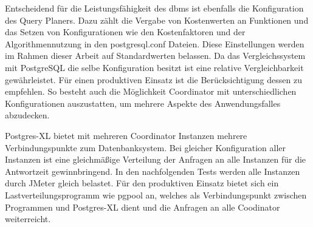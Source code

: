 Entscheidend für die Leistungsfähigkeit des \Gls{dbms} ist ebenfalls die Konfiguration des Query Planers.
Dazu zählt die Vergabe von Kostenwerten an Funktionen und das Setzen von Konfigurationen wie den Kostenfaktoren und der Algorithmennutzung in den postgresql.conf Dateien.
Diese Einstellungen werden im Rahmen dieser Arbeit auf Standardwerten belassen.
Da das Vergleichssystem mit PostgreSQL die selbe Konfiguration besitzt ist eine relative Vergleichbarkeit gewährleistet.
Für einen produktiven Einsatz ist die Berücksichtigung dessen zu empfehlen.
So besteht auch die Möglichkeit Coordinator mit unterschiedlichen Konfigurationen auszustatten, um mehrere Aspekte des Anwendungsfalles abzudecken.

Postgres-XL bietet mit mehreren Coordinator Instanzen mehrere Verbindungspunkte zum Datenbanksystem.
Bei gleicher Konfiguration aller Instanzen ist eine gleichmäßige Verteilung der Anfragen an alle Instanzen für die Antwortzeit gewinnbringend.
In den nachfolgenden Tests werden alle Instanzen durch JMeter gleich belastet.
Für den produktiven Einsatz bietet sich ein Lastverteilungsprogramm wie pgpool an, welches als Verbindungspunkt zwischen Programmen und Postgres-XL dient und die Anfragen an alle Coodinator weiterreicht.

